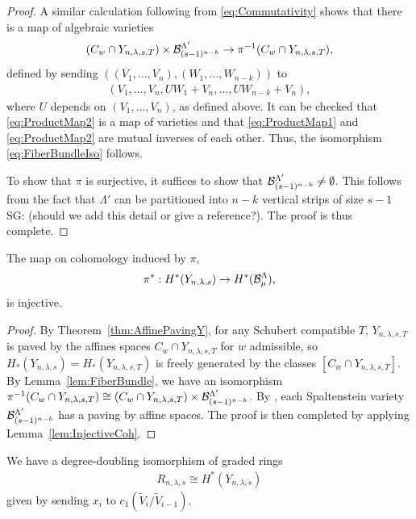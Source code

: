 \documentclass[12pt]{amsart}
\newcommand{\la}{\lambda}
\newcommand{\SG}[1]{{\color{red} SG: #1}}
\begin{document}
\begin{proof}
A similar calculation following from \eqref{eq:Commutativity} shows that there is a map of algebraic varieties
\begin{align}\label{eq:ProductMap2}
(C_{w}\cap Y_{n,\la,s,T})\times \cB_{(s-1)^{n-k}}^{\Lambda'}\to \pi^{-1}(C_{w}\cap Y_{n,\la,s,T}),
\end{align}
defined by sending $((V_1,\dots, V_n),(W_1,\dots, W_{n-k}))$ to 
\begin{align}
(V_1,\dots, V_n,UW_1+V_n,\dots, UW_{n-k}+V_n),
\end{align}
 where $U$ depends on $(V_1,\dots, V_n)$, as defined above.
 It can be checked that \eqref{eq:ProductMap2} is a map of varieties and that \eqref{eq:ProductMap1} and \eqref{eq:ProductMap2} are mutual inverses of each other. Thus, the isomorphism \eqref{eq:FiberBundleIso} follows.
 
To show that $\pi$ is surjective, it suffices to show that $\mathcal{B}_{(s-1)^{n-k}}^{\Lambda'}\neq \emptyset$. This follows from the fact that $\Lambda'$ can be partitioned into $n-k$ vertical strips of size $s-1$ \SG{(should we add this detail or give a reference?)}. The proof is thus complete.
\end{proof}

\begin{lemma}\label{lem:InjCohomology}
The map on cohomology induced by $\pi$,
\begin{align}
\pi^* : H^*(Y_{n,\la,s}) \to H^*(\cB_\mu^\Lambda),
\end{align}
is injective.
\end{lemma}

\begin{proof}
By Theorem~\ref{thm:AffinePavingY}, for any Schubert compatible $T$, $Y_{n,\la,s,T}$ is paved by the affines spaces $C_{w}\cap Y_{n,\la,s,T}$ for $w$ admissible, so $H_*(Y_{n,\la,s}) = H_*(Y_{n,\la,s,T})$ is freely generated by the classes $[C_w\cap Y_{n,\la,s,T}]$. By Lemma~\ref{lem:FiberBundle}, we have an isomorphism $\pi^{-1}(C_{w}\cap Y_{n,\la,s,T}) \cong (C_{w}\cap Y_{n,\la,s,T})\times \cB_{(s-1)^{n-k}}^{\Lambda'}$. By \cite{Brundan-Ostrik}, each Spaltenstein variety $\mathcal{B}_{(s-1)^{n-k}}^{\Lambda'}$ has a paving by affine spaces. The proof is then completed by applying Lemma~\ref{lem:InjectiveCoh}.
\end{proof}

\begin{theorem}\label{thm:MainTheorem}
We have a degree-doubling isomorphism of graded rings
\begin{align}
R_{n,\la,s} \cong H^*(Y_{n,\la,s})
\end{align}
given by sending $x_i$ to $c_1(\widetilde V_{i}/\widetilde V_{i-1})$.
\end{theorem}
\end{document}
